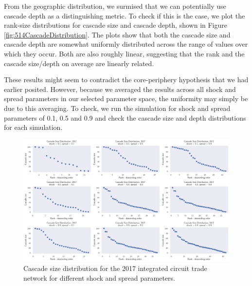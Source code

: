 \documentclass[12pt,letterpaper]{report}
\begin{document}
				From the geographic distribution, we surmised that we can potentially use cascade depth as a distinguishing metric. To check if this is the case, we plot the rank-size distributions for cascade size and cascade depth, shown in Figure \ref{fig:514CascadeDistribution}. The plots show that both the cascade size and cascade depth are somewhat uniformly distributed across the range of values over which they occur. Both are also roughly linear, suggesting that the rank and the cascade size/depth on average are linearly related. 
				
				These results might seem to contradict the core-periphery hypothesis that we had earlier posited. However, because we averaged the results across all shock and spread parameters in our selected parameter space, the uniformity may simply be due to this averaging. To check, we run the simulation for shock and spread parameters of 0.1, 0.5 and 0.9 and check the cascade size and depth distributions for each simulation. 
				
				\begin{figure}[!h]
					\centering
					\includegraphics[width=\textwidth]{Fig515-CascadeSizeDistribution.png}
					\caption{Cascade size distribution for the 2017 integrated circuit trade network for different shock and spread parameters.}\label{fig:515CascadeSizeDistribution}
				\end{figure}
			
\end{document}
